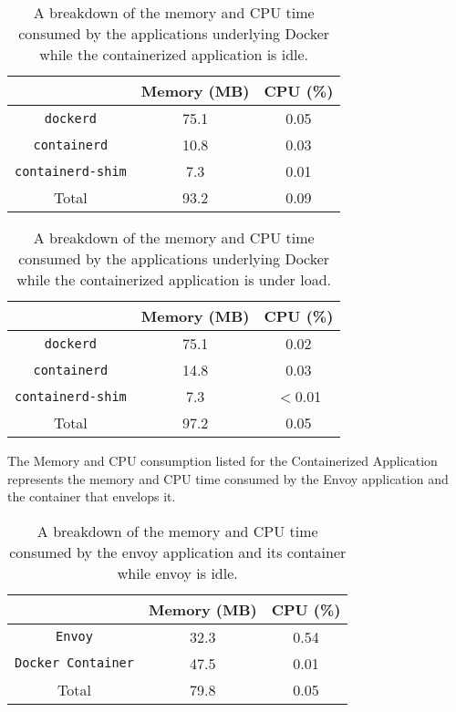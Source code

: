 \documentclass{article}
\begin{document}
\begin{table}[H]
\begin{tabular}{ |c|c|c| }
 \hline
   & Memory (MB) & CPU (\%) \\ 
 \hline
 \texttt{dockerd} & 75.1 & 0.05 \\
 \hline
 \texttt{containerd} & 10.8 & 0.03 \\
 \hline
 \texttt{containerd-shim} & 7.3 & 0.01 \\
 \hline\hline
 Total & 93.2 & 0.09 \\
 \hline
\end{tabular}
\caption{A breakdown of the memory and CPU time consumed by the applications underlying Docker while the containerized application is idle.}
\label{idle-consumption-breakdown}
\end{table}

\begin{table}[H]
\begin{tabular}{ |c|c|c| }
 \hline
   & Memory (MB) & CPU (\%) \\ 
 \hline
 \texttt{dockerd} & 75.1 & 0.02 \\
 \hline
 \texttt{containerd} & 14.8 & 0.03 \\
 \hline
 \texttt{containerd-shim} & 7.3 & $<$0.01 \\
 \hline\hline
 Total & 97.2 & 0.05 \\
 \hline
\end{tabular}
\caption{A breakdown of the memory and CPU time consumed by the applications underlying Docker while the containerized application is under load.}
\label{consumption-under-load-breakdown}
\end{table}

The Memory and CPU consumption listed for the Containerized Application represents the memory and CPU time consumed by the Envoy application and the container that envelops it.

\begin{table}[H]
\begin{tabular}{ |c|c|c| }
 \hline
   & Memory (MB) & CPU (\%) \\ 
 \hline
 \texttt{Envoy} & 32.3 & 0.54 \\
 \hline
 \texttt{Docker Container} & 47.5 & 0.01 \\
 \hline\hline
 Total & 79.8 & 0.05 \\
 \hline
\end{tabular}
\caption{A breakdown of the memory and CPU time consumed by the envoy application and its container while envoy is idle.}
\label{idle-app-consumption-breakdown}
\end{table}
\end{document}
